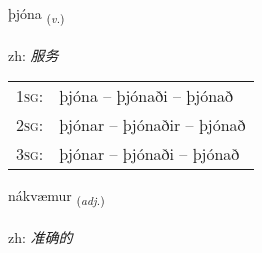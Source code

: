 \documentclass[frontgrid, backgrid]{flacards}\usepackage[]{graphicx}\usepackage[]{color}
\begin{document}
\renewcommand{\flhead}{\vskip5pt \fboxsep=0pt {\small\bfseries\footnotesize Sagnorð | 动词}}
\renewcommand{\fcfoot}{\vskip5pt \fboxsep=0pt \hspace{2pt}{\small\bfseries\footnotesize 2K}}

\renewcommand{\blhead}{\vskip5pt {\small\bfseries\footnotesize Sagnorð | 动词 }}
\renewcommand{\bcfoot}{\vskip5pt \hspace{2pt}{\small\bfseries\footnotesize 2K}}


{þjóna \small{\textsubscript{(\textit{v.})}} \\[1ex] %
\textphonetic{[θjouːna]} \\
zh: \emph{服务} \\  [2ex]
\renewcommand*{\arraystretch}{0.8}
\begin{tabular}{p{1cm}l}
\textsc{1sg}: & þjóna -- þjónaði -- þjónað \\ 
\textsc{2sg}: & þjónar -- þjónaðir -- þjónað \\ 
\textsc{3sg}: & þjónar -- þjónaði -- þjónað \\ 
\end{tabular}
}

\renewcommand{\flhead}{\vskip5pt \fboxsep=0pt {\small\bfseries\footnotesize Lýsingarorð | 形容词}}
\renewcommand{\fcfoot}{\vskip5pt \fboxsep=0pt \hspace{2pt}{\small\bfseries\footnotesize 2K}}

\renewcommand{\blhead}{\vskip5pt {\small\bfseries\footnotesize Lýsingarorð | 形容词 }}
\renewcommand{\bcfoot}{\vskip5pt \hspace{2pt}{\small\bfseries\footnotesize 2K}}


{nákvæmur \small{\textsubscript{(\textit{adj.})}} \\[1ex] %
\textphonetic{[nauːkʰvaimʏr]} \\
zh: \emph{准确的} \\  [2ex]
\renewcommand*{\arraystretch}{0.8}
}
\end{document}

